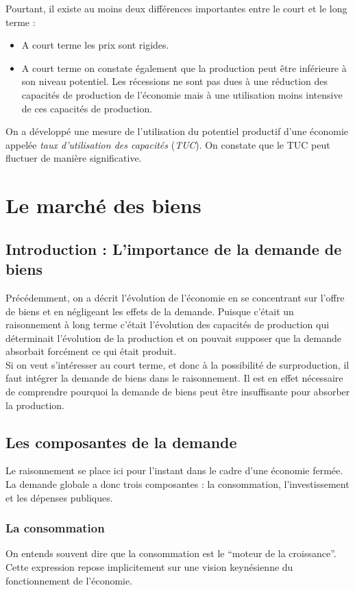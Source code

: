 \documentclass[10pt]{book}
\begin{document}
Pourtant, il existe au moins deux différences importantes entre le court et le long terme : 
\begin{itemize}
  \item A court terme les prix sont rigides.
  \item A court terme on constate également que la production peut être inférieure à son niveau potentiel. Les récessions ne sont pas dues à une réduction des capacités de production de l'économie mais à une utilisation moins intensive de ces capacités de production.
\end{itemize}
On a développé une mesure de l'utilisation du potentiel productif d'une économie appelée \textit{taux d'utilisation des capacités} (\textit{TUC}). On constate que le TUC peut fluctuer de manière significative.
\chapter{Le marché des biens}
\section{Introduction : L'importance de la demande de biens}
Précédemment, on a décrit l'évolution de l'économie en se concentrant sur l'offre de biens et en négligeant les effets de la demande. Puisque c'était un raisonnement à long terme c'était l'évolution des capacités de production qui déterminait l'évolution de la production et on pouvait supposer que la demande absorbait forcément ce qui était produit. \\
Si on veut s'intéresser au court terme,  et donc à la possibilité de surproduction, il faut intégrer la demande de biens dans le raisonnement. Il est en effet nécessaire de comprendre pourquoi la demande de biens peut être insuffisante pour absorber la production. \\
\section{Les composantes de la demande}
Le raisonnement se place ici pour l'instant dans le cadre d'une économie fermée. La demande globale a donc trois composantes : la consommation, l'investissement et les dépenses publiques.
\subsection{La consommation}
On entends souvent dire que la consommation est le ``moteur de la croissance''. Cette expression repose implicitement sur une vision keynésienne du fonctionnement de l'économie.
\end{document}
